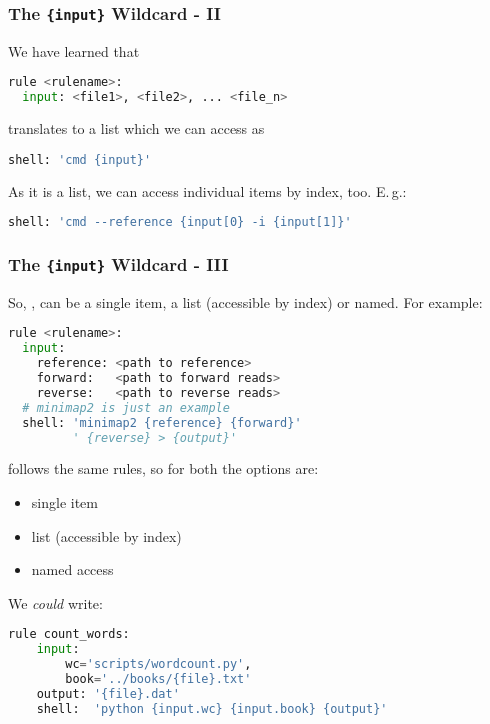 \begin{frame}[fragile]
  \frametitle{The \texttt{\{input\}} Wildcard - II}
  We have learned that
  \begin{lstlisting}[language=Python,style=Python]
rule <rulename>:
  input: <file1>, <file2>, ... <file_n>
  \end{lstlisting}
  translates to a list which we can access as
  \begin{lstlisting}[language=Python,style=Python]
  shell: 'cmd {input}'
  \end{lstlisting}
  As it is a list, we can access individual items by index, too. E.\,g.:
  \begin{lstlisting}[language=Python,style=Python]
  shell: 'cmd --reference {input[0} -i {input[1]}'
  \end{lstlisting}
\end{frame}

\begin{frame}[fragile]
  \frametitle{The  \texttt{\{input\}} Wildcard - III}
  So, , can be a single item, a list (accessible by index) or named. For example:
  \begin{lstlisting}[language=Python,style=Python]
rule <rulename>:
  input:
    reference: <path to reference>
    forward:   <path to forward reads>
    reverse:   <path to reverse reads>
  # minimap2 is just an example
  shell: 'minimap2 {reference} {forward}' 
         ' {reverse} > {output}'
  \end{lstlisting}
  \pause
   follows the same rules, so for both the options are:
  \begin{itemize}
   \item single item
   \item list (accessible by index)
   \item named access
  \end{itemize}
\end{frame}

\begin{frame}[fragile]
  We \emph{could} write:
  \begin{lstlisting}[language=Python,style=Python]
rule count_words:
    input:
        wc='scripts/wordcount.py',
        book='../books/{file}.txt'
    output: '{file}.dat'
    shell:  'python {input.wc} {input.book} {output}'
  \end{lstlisting}
\end{frame}

